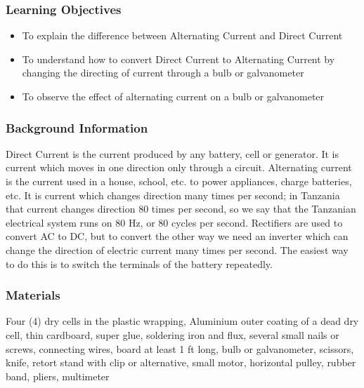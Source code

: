 \subsubsection*{Learning Objectives}
\begin{itemize}
\item{To explain the difference between Alternating Current and Direct Current} 
\item{To understand how to convert Direct Current to Alternating Current by changing the directing of current through a bulb or galvanometer} 
\item{To observe the effect of alternating current on a bulb or galvanometer} 
\end{itemize}

\subsubsection*{Background Information}
Direct Current is the current produced by any battery, cell or generator. It is current which moves in one direction only through a circuit. Alternating current is the current used in a house, school, etc. to power appliances, charge batteries, etc. It is current which changes direction many times per second; in Tanzania that current changes direction 80 times per second, so we say that the Tanzanian electrical system runs on 80 Hz, or 80 cycles per second.  
Rectifiers are used to convert AC to DC, but to convert the other way we need an inverter which can change the direction of electric current many times per second. The easiest way to do this is to switch the terminals of the battery repeatedly.  

\subsubsection*{Materials}
Four (4) dry cells in the plastic wrapping, Aluminium outer coating of a dead dry cell, thin cardboard, super glue, soldering iron and flux, several small nails or screws, connecting wires, board at least 1 ft long, bulb or galvanometer, scissors, knife, retort stand with clip or alternative, small motor, horizontal pulley, rubber band, pliers, multimeter


